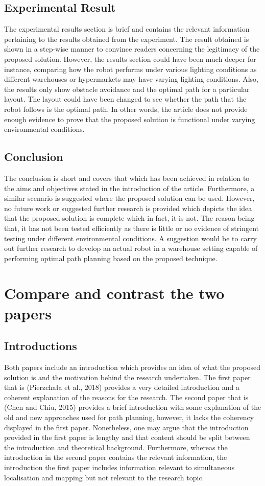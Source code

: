 \documentclass[a4paper, 12pt]{article}
\begin{document}
\subsection{Experimental Result}
The experimental results section is brief and contains the relevant information pertaining to the results obtained from the experiment. The result obtained is shown in a step-wise manner to convince readers concerning the legitimacy of the proposed solution. However, the results section could have been much deeper for instance, comparing how the robot performs under various lighting conditions as different warehouses or hypermarkets may have varying lighting conditions. Also, the results only show obstacle avoidance and the optimal path for a particular layout. The layout could have been changed to see whether the path that the robot follows is the optimal path. In other words, the article does not provide enough evidence to prove that the proposed solution is functional under varying environmental conditions.  

\subsection{Conclusion}
The conclusion is short and covers that which has been achieved in relation to the aims and objectives stated in the introduction of the article. Furthermore, a similar scenario is suggested where the proposed solution can be used. However, no future work or suggested further research is provided which depicts the idea that the proposed solution is complete which in fact, it is not. The reason being that, it has not been tested efficiently as there is little or no evidence of stringent testing under different environmental conditions. A suggestion would be to carry out further research to develop an actual robot in a warehouse setting capable of performing optimal path planning based on the proposed technique.

\section{Compare and contrast the two papers}

\subsection{Introductions}
Both papers include an introduction which provides an idea of what the proposed solution is and the motivation behind the research undertaken. The first paper that is (Pierzchała et al., 2018)  provides a very detailed introduction and a coherent explanation of the reasons for the research. The second paper that is (Chen and Chiu, 2015) provides a brief introduction with some explanation of the old and new approaches used for path planning, however, it lacks the coherency displayed in the first paper. Nonetheless, one may argue that the introduction provided in the first paper is lengthy and that content should be split between the introduction and theoretical background. Furthermore, whereas the introduction in the second paper contains the relevant information, the introduction the first paper includes information relevant to simultaneous localisation and mapping but not relevant to the research topic.
\end{document}
